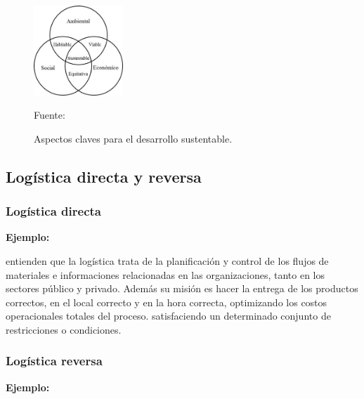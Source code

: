 \begin{figure}[ht]
\begin{center}
\includegraphics[width=0.3\textwidth]{Figura2}
\end{center}
\begin{center}
\vskip -0.5cm
\caption{\small{Aspectos claves para el desarrollo sustentable.}}
{\small{Fuente: \cite{Tanguay}}}
\end{center}
\end{figure}

\subsection{Logística directa y reversa}

\subsubsection{Logística directa}

{\bf Ejemplo:}\par

\cite{Ghiani} entienden que la logística trata de la planificación y control de los flujos de materiales e informaciones relacionadas en las organizaciones, tanto en los sectores público y privado. Además su misión es hacer la entrega de los productos correctos, en el local correcto y en la hora correcta, optimizando los costos operacionales totales del proceso.
satisfaciendo un determinado conjunto de restricciones o condiciones.\par

\subsubsection{Logística reversa}

{\bf Ejemplo:}\par

